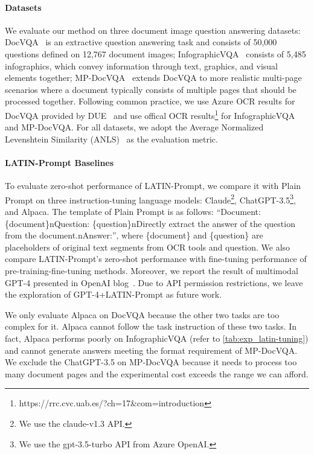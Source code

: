 \documentclass[letterpaper]{article} \usepackage{aaai24_preprint}  \usepackage{times}  \usepackage{helvet}  \usepackage{courier}  \usepackage[hyphens]{url}  \usepackage{graphicx} \urlstyle{rm} \def\UrlFont{\rm}  \usepackage{natbib}  \usepackage{caption} \frenchspacing  \setlength{\pdfpagewidth}{8.5in} \setlength{\pdfpageheight}{11in} \usepackage{algorithm}
\begin{document}
\paragraph{Datasets}
We evaluate our method on three document image question answering datasets:
DocVQA~\cite{mathewDocVQA2021} is an extractive question answering task and consists of 50,000 questions defined on 12,767 document images;
InfographicVQA~\cite{mathewInfographicVQA2021} consists of 5,485 infographics, which convey information through text, graphics, and visual elements together;
MP-DocVQA~\cite{titoMulti-PageDocVQAHi-VT52023} extends DocVQA to more realistic multi-page scenarios where a document typically consists of multiple pages that should be processed together.
Following common practice, we use Azure OCR results for DocVQA provided by DUE~\cite{borchmannDUEEndtoEndDocument2021} and use offical OCR results\footnote{https://rrc.cvc.uab.es/?ch=17\&com=introduction} for InfographicVQA and MP-DocVQA.
For all datasets, we adopt the Average Normalized Levenshtein Similarity (ANLS)~\cite{bitenST-VQA2019} as the evaluation metric.

\paragraph{LATIN-Prompt Baselines}
To evaluate zero-shot performance of LATIN-Prompt, we compare it with Plain Prompt on three instruction-tuning language models: Claude\footnote{We use the claude-v1.3 API.}, ChatGPT-3.5\footnote{We use the gpt-3.5-turbo API from Azure OpenAI.}, and Alpaca.
The template of Plain Prompt is as follows: ``Document: \{document\}nQuestion: \{question\}nDirectly extract the answer of the question from the document.nAnswer:'', where \{document\} and \{question\} are placeholders of original text segments from OCR tools and question.
We also compare LATIN-Prompt's zero-shot performance with fine-tuning performance of pre-training-fine-tuning methods.
Moreover, we report the result of multimodal GPT-4 presented in OpenAI blog~\cite{OpenAIGPT4Blog2023}.
Due to API permission restrictions, we leave the exploration of GPT-4+LATIN-Prompt as future work.

We only evaluate Alpaca on DocVQA because the other two tasks are too complex for it.
Alpaca cannot follow the task instruction of these two tasks.
In fact, Alpaca performs poorly on InfographicVQA (refer to \cref{tab:exp_latin-tuning}) and cannot generate answers meeting the format requirement of MP-DocVQA.
We exclude the ChatGPT-3.5 on MP-DocVQA because it needs to process too many document pages and the experimental cost exceeds the range we can afford.
\end{document}
